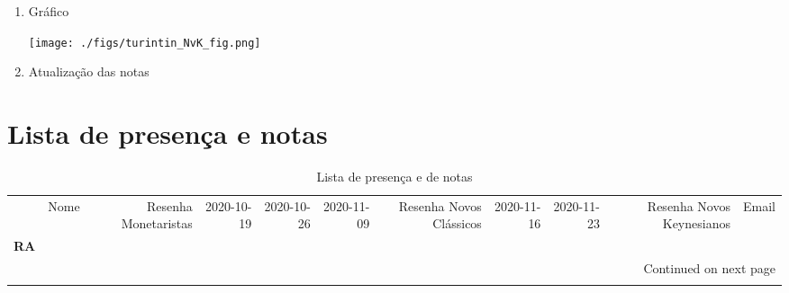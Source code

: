 \documentclass[11pt]{article}
\begin{document}
\begin{enumerate}
\item Gráfico
\label{sec:org73bb18f}
\begin{center}
\texttt{[image: ./figs/turintin\_NvK\_fig.png]}
\end{center}



\item Atualização das notas
\label{sec:org82e9e80}
\end{enumerate}

\section{Lista de presença e notas}
\label{sec:org12240dc}
\begin{center}\begin{landscape}
\small
\setlength\LTleft{0pt}
\setlength\LTright{0pt}
\begin{longtable}{llrrrrrrrrl}
\caption{Lista de presença e de notas}\label{lista}\\
\toprule
{} &                                   Nome &  Resenha Monetaristas &  2020-10-19 &  2020-10-26 &  2020-11-09 &  Resenha Novos Clássicos &  2020-11-16 &  2020-11-23 &  Resenha Novos Keynesianos &                   Email \\
\textbf{RA    } &                                        &                       &             &             &             &                          &             &             &                            &                         \\
\midrule
\endhead
\midrule
\multicolumn{11}{r}{{Continued on next page}} \\
\midrule
\endfoot


\end{longtable}
\end{landscape}
\end{center}
\end{document}
